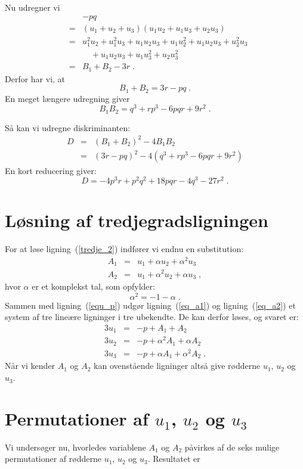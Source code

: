 \documentclass[12pt,oneside,a4paper]{article}
\newcommand{\bas}{\begin{eqnarray*}}
\newcommand{\eas}{\end{eqnarray*}}
\newcommand{\bea}{\begin{eqnarray}}
\newcommand{\eea}{\end{eqnarray}}
\begin{document}
Nu udregner vi
\bas
&& -pq \\
&=& (u_1+u_2+u_3)(u_1u_2 + u_1u_3 + u_2u_3) \\
&=& u_1^2u_2 + u_1^2u_3 + u_1u_2u_3 + u_1u_2^2 + u_1u_2u_3 + u_2^2u_3 \\
&& \quad + u_1u_2u_3 + u_1u_3^2 + u_2u_3^2 \\
&=& B_1 + B_2 - 3r \;.
\eas
Derfor har vi, at
\begin{equation}
B_1 + B_2 = 3r - pq \;.
\end{equation}
En meget længere udregning giver
\begin{equation}
B_1 B_2 = q^3 + rp^3 - 6pqr + 9r^2 \;.
\end{equation}

Så kan vi udregne diskriminanten:
\bas
D &=& (B_1+B_2)^2 - 4B_1B_2 \\
&=& (3r-pq)^2 - 4(q^3 + rp^3 - 6pqr + 9r^2) 
\eas
En kort reducering giver:
\begin{equation}
D = -4p^3r + p^2q^2 + 18pqr - 4q^3 - 27r^2 \;.
\label{eq_dis2}
\end{equation}

\section{Løsning af tredjegradsligningen}
For at løse ligning~(\ref{tredje_2}) indfører vi endnu en substitution:
\bea
A_1 &=& u_1 + \alpha u_2 + \alpha^2 u_3 \label{eq_a1}\\
A_2 &=& u_1 + \alpha^2 u_2 + \alpha u_3  \label{eq_a2}\;,
\eea
hvor $\alpha$ er et komplekst tal, som opfylder:
\begin{equation}
\alpha^2 = -1 - \alpha \;.
\end{equation}
Sammen med ligning~(\ref{equ_p}) udgør ligning~(\ref{eq_a1}) og
ligning~(\ref{eq_a2}) et system af tre lineære ligninger i tre ubekendte.
De kan derfor løses, og svaret er:
\bea
3u_1 &=& -p + A_1 + A_2 \label{eq_u1}\\
3u_2 &=& -p + \alpha^2 A_1 + \alpha A_2 \label{eq_u2}\\
3u_3 &=& -p + \alpha A_1 + \alpha^2 A_2 \label{eq_u3}\;.
\eea
Når vi kender $A_1$ og $A_2$ kan ovenstående ligninger altså give rødderne
$u_1$, $u_2$ og $u_3$.

\section{Permutationer af $u_1$, $u_2$ og $u_3$}
Vi undersøger nu, hvorledes variablene $A_1$ og $A_2$ påvirkes af de seks
mulige permutationer af rødderne $u_1$, $u_2$ og $u_3$. Resultatet er
\end{document}
